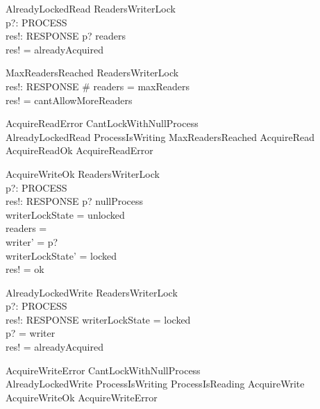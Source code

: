 \documentclass{article}
\begin{document}
\begin{schema}{AlreadyLockedRead}
    \Xi ReadersWriterLock \\
    p?: PROCESS \\
    res!: RESPONSE
\where
    p? \in readers \\
    res! = alreadyAcquired
\end{schema}

\begin{schema}{MaxReadersReached}
    \Xi ReadersWriterLock \\
    res!: RESPONSE
\where
    \# readers = maxReaders \\
    res! = cantAllowMoreReaders
\end{schema}

\begin{zed}
AcquireReadError  CantLockWithNullProcess \\ \quad \lor AlreadyLockedRead \lor ProcessIsWriting \lor MaxReadersReached  
\also
AcquireRead  AcquireReadOk \lor AcquireReadError 
\end{zed}

\begin{schema}{AcquireWriteOk}
    \Delta ReadersWriterLock \\
    p?: PROCESS \\
    res!: RESPONSE
\where
    p? \neq nullProcess \\
    writerLockState = unlocked \\
    readers = \emptyset \\
    writer' = p? \\
    writerLockState' = locked \\
    res! = ok
\end{schema}

\begin{schema}{AlreadyLockedWrite}
    \Xi ReadersWriterLock \\
    p?: PROCESS \\
    res!: RESPONSE
\where
    writerLockState = locked \\
    p? = writer \\
    res! = alreadyAcquired
\end{schema}

\begin{zed}
AcquireWriteError  CantLockWithNullProcess  \\ \quad \lor AlreadyLockedWrite \lor ProcessIsWriting \lor ProcessIsReading 
\also
AcquireWrite  AcquireWriteOk \lor AcquireWriteError 
\end{zed}
\end{document}
